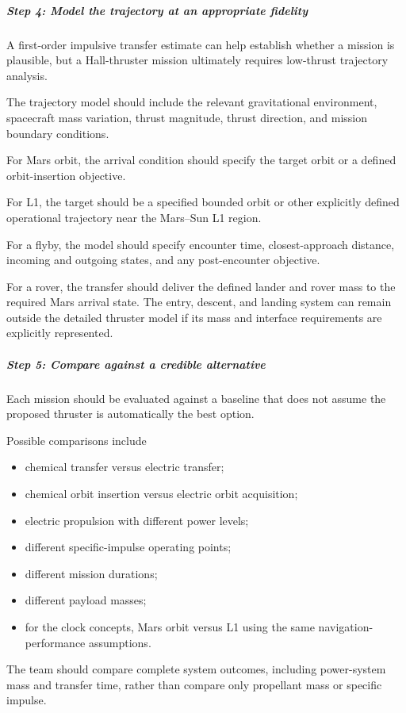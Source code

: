 \subparagraph{Step 4: Model the trajectory at an appropriate fidelity}

A first-order impulsive transfer estimate can help establish
whether a mission is plausible, but a Hall-thruster mission
ultimately requires low-thrust trajectory analysis.

The trajectory model should include the relevant gravitational
environment, spacecraft mass variation, thrust magnitude,
thrust direction, and mission boundary conditions.

For Mars orbit, the arrival condition should specify the
target orbit or a defined orbit-insertion objective.

For L1, the target should be a specified bounded orbit or
other explicitly defined operational trajectory near the
Mars--Sun L1 region.

For a flyby, the model should specify encounter time,
closest-approach distance, incoming and outgoing states,
and any post-encounter objective.

For a rover, the transfer should deliver the defined lander
and rover mass to the required Mars arrival state. The entry,
descent, and landing system can remain outside the detailed
thruster model if its mass and interface requirements are
explicitly represented.

\subparagraph{Step 5: Compare against a credible alternative}

Each mission should be evaluated against a baseline that
does not assume the proposed thruster is automatically
the best option.

Possible comparisons include

\begin{itemize}
	\item chemical transfer versus electric transfer;
	\item chemical orbit insertion versus electric orbit acquisition;
	\item electric propulsion with different power levels;
	\item different specific-impulse operating points;
	\item different mission durations;
	\item different payload masses;
	\item for the clock concepts, Mars orbit versus L1 using
	      the same navigation-performance assumptions.
\end{itemize}

The team should compare complete system outcomes, including
power-system mass and transfer time, rather than compare
only propellant mass or specific impulse.

